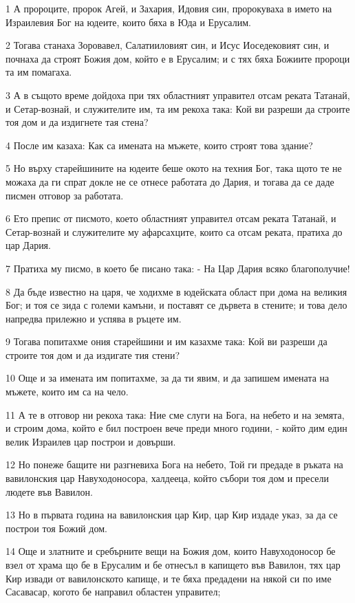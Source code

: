 \par 1 А пророците, пророк Агей, и Захария, Идовия син, пророкуваха в името на Израилевия Бог на юдеите, които бяха в Юда и Ерусалим.
\par 2 Тогава станаха Зоровавел, Салатииловият син, и Исус Иоседековият син, и почнаха да строят Божия дом, който е в Ерусалим; и с тях бяха Божиите пророци та им помагаха.
\par 3 А в същото време дойдоха при тях областният управител отсам реката Татанай, и Сетар-вознай, и служителите им, та им рекоха така: Кой ви разреши да строите тоя дом и да издигнете тая стена?
\par 4 После им казаха: Как са имената на мъжете, които строят това здание?
\par 5 Но върху старейшините на юдеите беше окото на техния Бог, така щото те не можаха да ги спрат докле не се отнесе работата до Дария, и тогава да се даде писмен отговор за работата.
\par 6 Ето препис от писмото, което областният управител отсам реката Татанай, и Сетар-вознай и служителите му афарсахците, които са отсам реката, пратиха до цар Дария.
\par 7 Пратиха му писмо, в което бе писано така: - На Цар Дария всяко благополучие!
\par 8 Да бъде известно на царя, че ходихме в юдейската област при дома на великия Бог; и тоя се зида с големи камъни, и поставят се дървета в стените; и това дело напредва прилежно и успява в ръцете им.
\par 9 Тогава попитахме ония старейшини и им казахме така: Кой ви разреши да строите тоя дом и да издигате тия стени?
\par 10 Още и за имената им попитахме, за да ти явим, и да запишем имената на мъжете, които им са на чело.
\par 11 А те в отговор ни рекоха така: Ние сме слуги на Бога, на небето и на земята, и строим дома, който е бил построен вече преди много години, - който дим един велик Израилев цар построи и довърши.
\par 12 Но понеже бащите ни разгневиха Бога на небето, Той ги предаде в ръката на вавилонския цар Навуходоносора, халдееца, който събори тоя дом и пресели людете във Вавилон.
\par 13 Но в първата година на вавилонския цар Кир, цар Кир издаде указ, за да се построи тоя Божий дом.
\par 14 Още и златните и сребърните вещи на Божия дом, които Навуходоносор бе взел от храма що бе в Ерусалим и бе отнесъл в капището във Вавилон, тях цар Кир извади от вавилонското капище, и те бяха предадени на някой си по име Сасавасар, когото бе направил областен управител;
